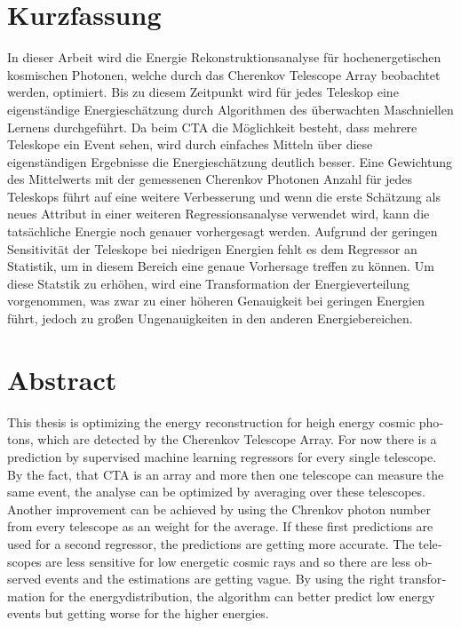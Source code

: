 \thispagestyle{plain}

\section*{Kurzfassung}
In dieser Arbeit wird die Energie Rekonstruktionsanalyse für hochenergetischen kosmischen Photonen, welche durch das Cherenkov Telescope Array beobachtet
werden, optimiert.
Bis zu diesem Zeitpunkt wird für jedes Teleskop eine eigenständige Energieschätzung durch Algorithmen des überwachten Maschniellen Lernens durchgeführt.
Da beim CTA die Möglichkeit besteht, dass mehrere Teleskope ein Event sehen, wird durch einfaches Mitteln über diese eigenständigen Ergebnisse die
Energieschätzung deutlich besser.
Eine Gewichtung des Mittelwerts mit der gemessenen Cherenkov Photonen Anzahl für jedes Teleskops führt auf eine weitere Verbesserung und wenn die erste
Schätzung als neues Attribut in einer weiteren Regressionsanalyse verwendet wird, kann die tatsächliche Energie noch genauer vorhergesagt werden.
Aufgrund der geringen Sensitivität der Teleskope bei niedrigen Energien fehlt es dem Regressor an Statistik, um in diesem Bereich eine genaue Vorhersage
treffen zu können.
Um diese Statstik zu erhöhen, wird eine Transformation der Energieverteilung vorgenommen, was zwar zu einer höheren Genauigkeit bei geringen Energien führt,
jedoch zu großen Ungenauigkeiten in den anderen Energiebereichen.

\section*{Abstract}
\begin{english}
This thesis is optimizing the energy reconstruction for heigh energy cosmic photons, which are detected by the Cherenkov Telescope Array.
For now there is a prediction by supervised machine learning regressors for every single telescope.
By the fact, that CTA is an array and more then one telescope can measure the same event, the analyse can be optimized by averaging over these telescopes.
Another improvement can be achieved by using the Chrenkov photon number from every telescope as an weight for the average.
If these first predictions are used for a second regressor, the predictions are getting more accurate.
The telescopes are less sensitive for low energetic cosmic rays and so there are less observed events and the estimations are getting vague.
By using the right transformation for the energydistribution, the algorithm can better predict low energy events but getting worse for the higher energies.
\end{english}
